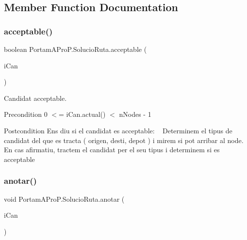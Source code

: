 \subsection{Member Function Documentation}
\mbox{\label{class_portam_a_pro_p_1_1_solucio_ruta_a63c5960d90ed9c344493ea0f8eed1498}} 
\subsubsection{\texorpdfstring{acceptable()}{acceptable()}}
{\footnotesize\ttfamily boolean Portam\+A\+Pro\+P.\+Solucio\+Ruta.\+acceptable (\begin{DoxyParamCaption}\item[{\hyperlink{class_portam_a_pro_p_1_1_candidat_ruta}{Candidat\+Ruta}}]{i\+Can }\end{DoxyParamCaption})}



Candidat acceptable. 

\begin{DoxyPrecond}{Precondition}
0 $<$= i\+Can.\+actual() $<$ n\+Nodes -\/ 1 
\end{DoxyPrecond}
\begin{DoxyPostcond}{Postcondition}
Ens diu si el candidat es acceptable\+: ~\newline
Determinem el tipus de candidat del que es tracta ( origen, desti, depot ) i mirem si pot arribar al node. En cas afirmatiu, tractem el candidat per el seu tipus i determinem si es acceptable 
\end{DoxyPostcond}
\mbox{\label{class_portam_a_pro_p_1_1_solucio_ruta_a616aa2104765f1218a426944ec1695b6}} 
\subsubsection{\texorpdfstring{anotar()}{anotar()}}
{\footnotesize\ttfamily void Portam\+A\+Pro\+P.\+Solucio\+Ruta.\+anotar (\begin{DoxyParamCaption}\item[{\hyperlink{class_portam_a_pro_p_1_1_candidat_ruta}{Candidat\+Ruta}}]{i\+Can }\end{DoxyParamCaption})}



